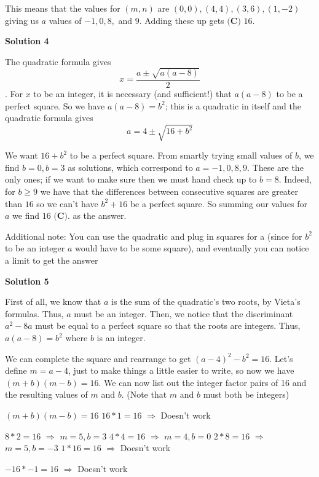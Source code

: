 \begin{enumerate}
 This means that the values for $(m,n)$ are $(0,0),(4,4),(3,6),(1,-2)$ giving us $a$ values of $-1,0,8,$ and $9$. Adding these up gets $\boxed{\textbf{(C) }16}$.

 



\textbf{Solution 4}

The quadratic formula gives 
 \[x = \frac{a \pm \sqrt{a(a-8)}}{2}\]. For $x$ to be an integer, it is necessary (and sufficient!) that $a(a-8)$ to be a perfect square. So we have $a(a-8) = b^2$; this is a quadratic in itself and the quadratic formula gives 
 \[a = 4 \pm \sqrt{16 + b^2}\]

 We want $16 + b^2$ to be a perfect square. From smartly trying small values of $b$, we find $b = 0, b = 3$ as solutions, which correspond to $a = -1, 0, 8, 9$. These are the only ones; if we want to make sure then we must hand check up to $b=8$. Indeed, for $b \geq 9$ we have that the differences between consecutive squares are greater than $16$ so we can't have $b^2 + 16$ be a perfect square. So summing our values for $a$ we find $\boxed{16 \textbf{ (C)}}$. as the answer.

 Additional note: You can use the quadratic and plug in squares for a (since for $b^2$ to be an integer $a$ would have to be some square), and eventually you can notice a limit to get the answer~

 


 



\textbf{Solution 5}

First of all, we know that $a$ is the sum of the quadratic's two roots, by Vieta's formulas. Thus, $a$ must be an integer. Then, we notice that the discriminant $a^2-8a$ must be equal to a perfect square so that the roots are integers. Thus, $a(a-8)=b^2$ where $b$ is an integer. 

 We can complete the square and rearrange to get $(a-4)^2-b^2=16$. Let's define $m=a-4$, just to make things a little easier to write, so now we have $(m+b)(m-b)=16$. We can now list out the integer factor pairs of 16 and the resulting values of $m$ and $b$. (Note that $m$ and $b$ must both be integers)

 
$(m+b)(m-b)=16$
$16*1=16$ $\Rightarrow$ Doesn't work

 $8*2=16$ $\Rightarrow$ $m=5, b=3$
$4*4=16$ $\Rightarrow$ $m=4, b=0$
$2*8=16$ $\Rightarrow$ $m=5, b=-3$
$1*16=16$ $\Rightarrow$ Doesn't work

 $-16*-1=16$ $\Rightarrow$ Doesn't work


\end{enumerate}
